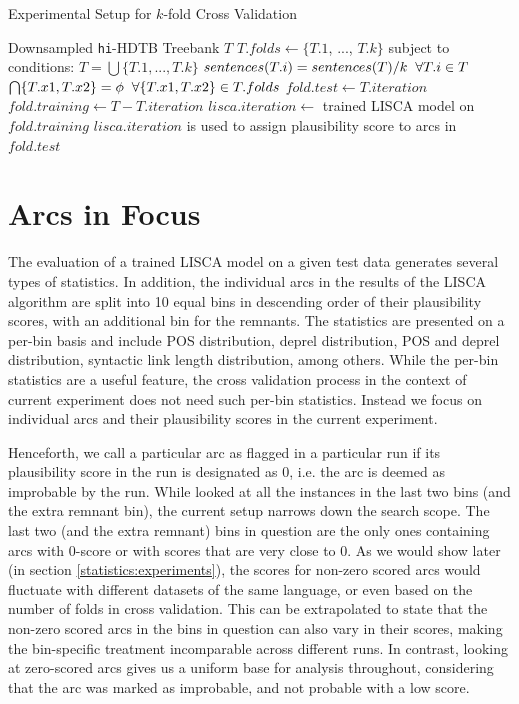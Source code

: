 \begin{algorithm}[H]
\caption{Experimental Setup for \(k\)-fold Cross Validation}
\label{algo:liscadata}
    \begin{algorithmic}[1]
    \REQUIRE Downsampled \texttt{hi}-HDTB Treebank $T$
        \STATE $T.folds \leftarrow \{T.1$, ..., $T.k\}$ subject to conditions:
        \STATE $T = \bigcup \{T.1, ..., T.k\}$ 
        \STATE $sentences(T.i) = sentences(T)/k \hspace{2mm} \forall T.i \in T$
        \STATE $\bigcap \{T.x1, T.x2\} = \phi \hspace{2mm} \forall \{T.x1, T.x2\}  \in T.folds$ 
            \STATE $fold.test \leftarrow T.iteration$
            \STATE $fold.training \leftarrow T - T.iteration$
            \STATE $lisca.iteration \leftarrow$ trained LISCA model on $fold.training$
            \STATE $lisca.iteration$ is used to assign plausibility score to arcs in $fold.test$
        \ENDFOR
    \ENDFOR
    \end{algorithmic}
\end{algorithm}

\section{Arcs in Focus}
\label{arcs:focus}

The evaluation of a trained LISCA model on a given test data generates several types of statistics. In addition, the individual arcs in the results of the LISCA algorithm are split into 10 equal bins in descending order of their plausibility scores, with an additional bin for the remnants. The statistics are presented on a per-bin basis and include POS distribution, deprel distribution, POS and deprel distribution, syntactic link length distribution, among others. While the per-bin statistics are a useful feature, the cross validation process in the context of current experiment does not need such per-bin statistics. Instead we focus on individual arcs and their plausibility scores in the current experiment.

Henceforth, we call a particular arc as flagged in a particular run if its plausibility score in the run is designated as 0, i.e. the arc is deemed as improbable by the run. While \cite{alzetta2017dangerous} looked at all the instances in the last two bins (and the extra remnant bin), the current setup narrows down the search scope. The last two (and the extra remnant) bins in question are the only ones containing arcs with 0-score or with scores that are very close to 0. As we would show later (in section \ref{statistics:experiments}), the scores for non-zero scored arcs would fluctuate with different datasets of the same language, or even based on the number of folds in cross validation. This can be extrapolated to state that the non-zero scored arcs in the bins in question can also vary in their scores, making the bin-specific treatment incomparable across different runs. In contrast, looking at zero-scored arcs gives us a uniform base for analysis throughout, considering that the arc was marked as improbable, and not probable with a low score.

